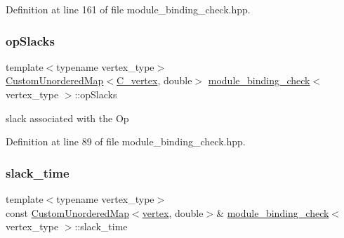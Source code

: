 Definition at line 161 of file module\+\_\+binding\+\_\+check.\+hpp.

\mbox{\label{structmodule__binding__check_a14a1f8fe4d8bdfd05bcaca161dac24d5}} 
\subsubsection{\texorpdfstring{op\+Slacks}{opSlacks}}
{\footnotesize\ttfamily template$<$typename vertex\+\_\+type$>$ \\
\hyperlink{custom__map_8hpp_ad1ed68f2ff093683ab1a33522b144adc}{Custom\+Unordered\+Map}$<$\hyperlink{clique__covering__graph_8hpp_a9cb45047ea8c5ed95a8cfa90494345aa}{C\+\_\+vertex}, double$>$ \hyperlink{structmodule__binding__check}{module\+\_\+binding\+\_\+check}$<$ vertex\+\_\+type $>$\+::op\+Slacks\hspace{0.3cm}{\ttfamily [private]}}



slack associated with the Op 



Definition at line 89 of file module\+\_\+binding\+\_\+check.\+hpp.

\mbox{\label{structmodule__binding__check_a32b8f6bff5beb2a18a7ef2a0252536f2}} 
\subsubsection{\texorpdfstring{slack\+\_\+time}{slack\_time}}
{\footnotesize\ttfamily template$<$typename vertex\+\_\+type$>$ \\
const \hyperlink{custom__map_8hpp_ad1ed68f2ff093683ab1a33522b144adc}{Custom\+Unordered\+Map}$<$\hyperlink{graph_8hpp_abefdcf0544e601805af44eca032cca14}{vertex}, double$>$\& \hyperlink{structmodule__binding__check}{module\+\_\+binding\+\_\+check}$<$ vertex\+\_\+type $>$\+::slack\+\_\+time\hspace{0.3cm}{\ttfamily [private]}}



